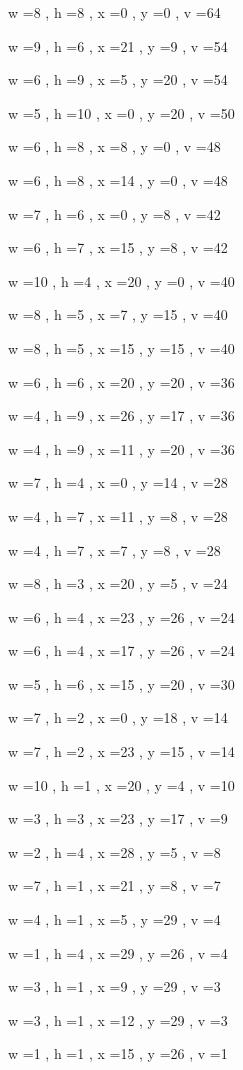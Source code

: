\documentclass[11pt]{article}
\begin{document}
w =8 , h =8 , x =0 , y =0 , v =64
\par
w =9 , h =6 , x =21 , y =9 , v =54
\par
w =6 , h =9 , x =5 , y =20 , v =54
\par
w =5 , h =10 , x =0 , y =20 , v =50
\par
w =6 , h =8 , x =8 , y =0 , v =48
\par
w =6 , h =8 , x =14 , y =0 , v =48
\par
w =7 , h =6 , x =0 , y =8 , v =42
\par
w =6 , h =7 , x =15 , y =8 , v =42
\par
w =10 , h =4 , x =20 , y =0 , v =40
\par
w =8 , h =5 , x =7 , y =15 , v =40
\par
w =8 , h =5 , x =15 , y =15 , v =40
\par
w =6 , h =6 , x =20 , y =20 , v =36
\par
w =4 , h =9 , x =26 , y =17 , v =36
\par
w =4 , h =9 , x =11 , y =20 , v =36
\par
w =7 , h =4 , x =0 , y =14 , v =28
\par
w =4 , h =7 , x =11 , y =8 , v =28
\par
w =4 , h =7 , x =7 , y =8 , v =28
\par
w =8 , h =3 , x =20 , y =5 , v =24
\par
w =6 , h =4 , x =23 , y =26 , v =24
\par
w =6 , h =4 , x =17 , y =26 , v =24
\par
w =5 , h =6 , x =15 , y =20 , v =30
\par
w =7 , h =2 , x =0 , y =18 , v =14
\par
w =7 , h =2 , x =23 , y =15 , v =14
\par
w =10 , h =1 , x =20 , y =4 , v =10
\par
w =3 , h =3 , x =23 , y =17 , v =9
\par
w =2 , h =4 , x =28 , y =5 , v =8
\par
w =7 , h =1 , x =21 , y =8 , v =7
\par
w =4 , h =1 , x =5 , y =29 , v =4
\par
w =1 , h =4 , x =29 , y =26 , v =4
\par
w =3 , h =1 , x =9 , y =29 , v =3
\par
w =3 , h =1 , x =12 , y =29 , v =3
\par
w =1 , h =1 , x =15 , y =26 , v =1
\par
\newpage
\end{document}
